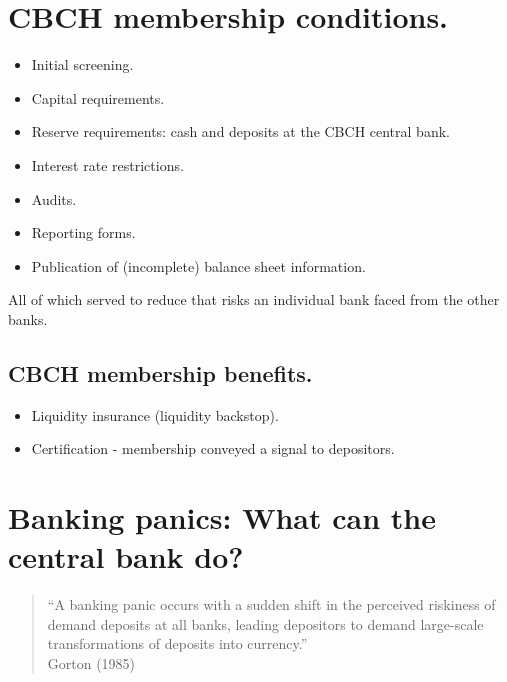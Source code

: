 \documentclass[20pt]{article}
\begin{document}
\section{CBCH membership conditions.}
\begin{itemize}
    \item Initial screening.
    \item Capital requirements.
    \item Reserve requirements:  cash and deposits at the CBCH central bank.
    \item Interest rate restrictions.
    \item Audits.
    \item Reporting forms.
    \item Publication of (incomplete) balance sheet information.
\end{itemize}
All of which served to reduce that risks an individual bank faced from the other banks. 
\subsection{CBCH membership benefits.}
\begin{itemize}
    \item Liquidity insurance (liquidity backstop).
    \item Certification - membership conveyed a signal to depositors.
\end{itemize}



\section{Banking panics: What can the central bank do?}

\begin{quote}``A banking panic occurs with a sudden shift in the perceived riskiness of demand deposits at all banks, leading depositors to demand large-scale transformations of deposits into currency.''\\ Gorton (1985)\end{quote}
\end{document}
